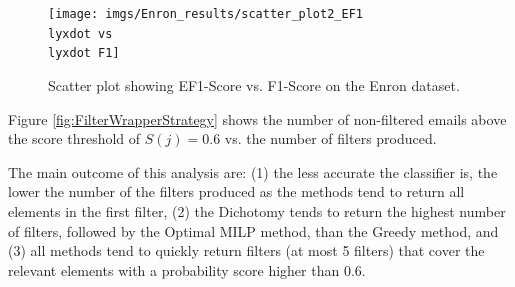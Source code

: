\begin{figure}[H]
\begin{centering}
\par\end{centering}
\begin{centering}
{\texttt{[image: imgs/Enron\_results/scatter\_plot2\_EF1\\lyxdot vs\\lyxdot F1]}}
\par\end{centering}
\caption{Scatter plot showing EF1-Score vs. F1-Score on the Enron dataset.}
\label{fig:F1_vs_EF1_Enron}
\end{figure}






 Figure \ref{fig:FilterWrapperStrategy} shows the number of non-filtered emails above the score threshold of $S(j)=0.6$ vs. the number of filters produced.

The main outcome of this analysis are: (1) the less accurate the classifier is, the lower the number of the filters produced as the methods tend to return all elements in the first filter, (2) the Dichotomy tends to return the highest number of filters, followed by the Optimal MILP method, than the Greedy method, and (3) all methods tend to quickly return filters (at most 5 filters) that cover the relevant elements with a probability score higher than 0.6.



